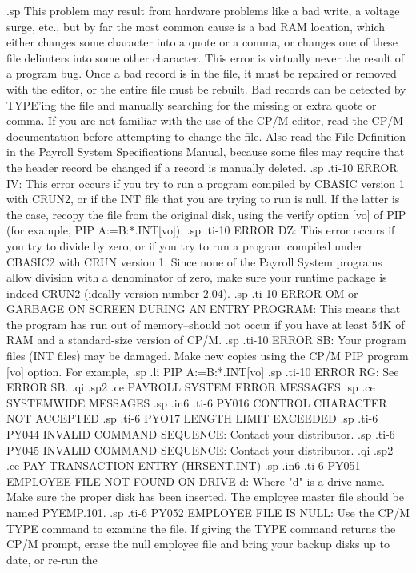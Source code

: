 .sp
This problem may result from hardware
problems like a bad write, a voltage surge, etc., but by far
the most common cause is a bad RAM location, which either changes
some character into a quote or a comma, or changes one of these
file delimters into some other character.  This error is virtually never
the result of a program bug.  Once a bad record is in the file, it must be
repaired or removed with the editor, or the entire file must
be rebuilt.  Bad records can be detected by TYPE'ing the
file and manually searching for the missing or extra
quote or comma.  If you are not familiar with the use of the CP/M editor,
read the CP/M documentation before attempting to change the file.
Also read the File Definition in the Payroll System Specifications
Manual, because some files may require that the header record be
changed if a record is manually deleted.
.sp
.ti-10
ERROR IV: This error occurs if you try to run a program compiled
by CBASIC version 1 with CRUN2, or if the INT file that you are
trying to run is null.	If the latter is the case, recopy the
file from the original disk, using the verify option [vo] of PIP (for
example, PIP A:=B:*.INT[vo]).
.sp
.ti-10
ERROR DZ: This error occurs if you try to divide by zero, or if you try
to run a program compiled under CBASIC2 with CRUN version 1.  Since
none of the Payroll System programs allow division with a
denominator of zero, make sure your runtime package is
indeed CRUN2 (ideally version number 2.04).
.sp
.ti-10
ERROR OM or GARBAGE ON SCREEN DURING AN ENTRY PROGRAM: This means
that the program has run out of memory--should not occur if you have
at least 54K of RAM and a standard-size version of CP/M.
.sp
.ti-10
ERROR SB: Your program files (INT files) may be damaged.  Make new
copies using the CP/M PIP program [vo] option.	For example,
.sp
.li
	  PIP A:=B:*.INT[vo]
.sp
.ti-10
ERROR RG: See ERROR SB.
.qi
.sp2
.ce
PAYROLL SYSTEM ERROR MESSAGES
.sp
.ce
SYSTEMWIDE MESSAGES
.sp
.in6
.ti-6
PY016 CONTROL CHARACTER NOT ACCEPTED
.sp
.ti-6
PYO17 LENGTH LIMIT EXCEEDED
.sp
.ti-6
PY044 INVALID COMMAND SEQUENCE: Contact your distributor.
.sp
.ti-6
PY045 INVALID COMMAND SEQUENCE: Contact your distributor.
.qi
.sp2
.ce
PAY TRANSACTION ENTRY (HRSENT.INT)
.sp
.in6
.ti-6
PY051 EMPLOYEE FILE NOT FOUND ON DRIVE d: Where "d" is a drive name.
Make sure the proper disk has
been inserted.	The employee master file should be named PYEMP.101.
.sp
.ti-6
PY052 EMPLOYEE FILE IS NULL:  Use the CP/M TYPE command to examine the file.
If giving the TYPE command returns the CP/M prompt, erase the null employee
file and bring your backup disks up to date, or re-run the
